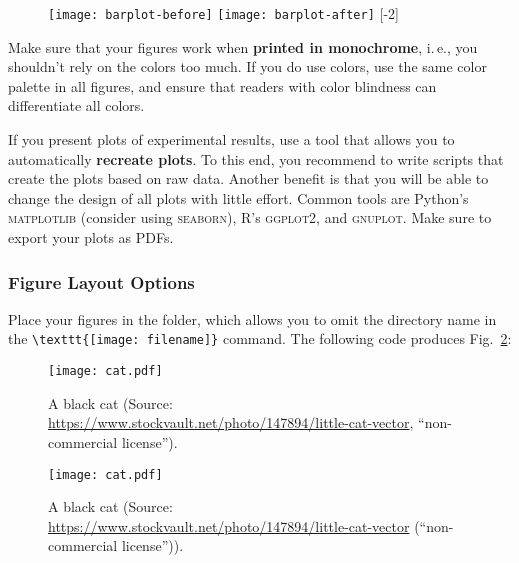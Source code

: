 \begin{figure}[t]
\centering
\texttt{[image: barplot-before]}%
\hspace{\fill}%
\texttt{[image: barplot-after]}
[-2\baselineskip]
\end{figure}


Make sure that your figures work when \textbf{printed in monochrome}, i.\,e., you shouldn't rely on the colors too much. If you do use colors, use the same color palette in all figures, and ensure that readers with color blindness can differentiate all colors.

If you present plots of experimental results, use a tool that allows you to automatically \textbf{recreate plots}. To this end, you recommend to write scripts that create the plots based on raw data. Another benefit is that you will be able to change the design of all plots with little effort.%
Common tools are Python's \textsc{matplotlib} (consider using \textsc{seaborn}), R's \textsc{ggplot2}, and \textsc{gnuplot}. Make sure to export your plots as PDFs.

\subsubsection{Figure Layout Options}

Place your figures in the  folder, which allows you to omit the directory name in the \verb|\texttt{[image: filename]}| command.
The following code produces Fig.~\ref{fig:cat}:
\begin{latex}
\begin{figure}[t] %
\centering
\texttt{[image: cat.pdf]}
\decoRule
\caption[A black cat]{A black cat (Source: \url{https://www.stockvault.net/photo/147894/little-cat-vector}, ``non-commercial license'').}
\label{fig:cat}
\end{figure}
\end{latex}

\begin{figure}[t] %
\centering
\texttt{[image: cat.pdf]}
\decoRule
\caption[A black cat]{A black cat (Source: \url{https://www.stockvault.net/photo/147894/little-cat-vector} (``non-commercial license'')).}
\label{fig:cat}
\end{figure}

